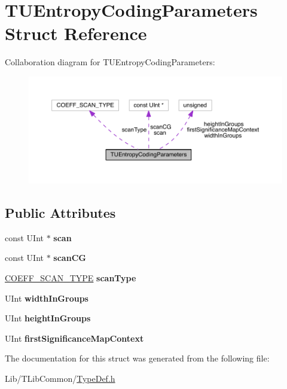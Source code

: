\hypertarget{struct_t_u_entropy_coding_parameters}{}\section{T\+U\+Entropy\+Coding\+Parameters Struct Reference}
\label{struct_t_u_entropy_coding_parameters}


Collaboration diagram for T\+U\+Entropy\+Coding\+Parameters\+:
\nopagebreak
\begin{figure}[H]
\begin{center}
\leavevmode
\includegraphics[width=350pt]{d6/da5/struct_t_u_entropy_coding_parameters__coll__graph}
\end{center}
\end{figure}
\subsection*{Public Attributes}
\begin{DoxyCompactItemize}
\item 
\mbox{\label{struct_t_u_entropy_coding_parameters_a5bad748cbd7600ccf7432b5ea9c61669}} 
const U\+Int $\ast$ {\bfseries scan}
\item 
\mbox{\label{struct_t_u_entropy_coding_parameters_ac28bf9666b747b1cbd0080b193fb5f3a}} 
const U\+Int $\ast$ {\bfseries scan\+CG}
\item 
\mbox{\label{struct_t_u_entropy_coding_parameters_a7c0032d746a077dd462325ded1574e53}} 
\hyperlink{_type_def_8h_a30c02674008b9ee63cee39a5e1261884}{C\+O\+E\+F\+F\+\_\+\+S\+C\+A\+N\+\_\+\+T\+Y\+PE} {\bfseries scan\+Type}
\item 
\mbox{\label{struct_t_u_entropy_coding_parameters_abcb62031ff1232c5ddcc6f91f503d938}} 
U\+Int {\bfseries width\+In\+Groups}
\item 
\mbox{\label{struct_t_u_entropy_coding_parameters_a6ed4823cac43cacc1c34408f9b49bf3a}} 
U\+Int {\bfseries height\+In\+Groups}
\item 
\mbox{\label{struct_t_u_entropy_coding_parameters_a6d5047fc99b481e5db290bf6a33ab0f1}} 
U\+Int {\bfseries first\+Significance\+Map\+Context}
\end{DoxyCompactItemize}


The documentation for this struct was generated from the following file\+:\begin{DoxyCompactItemize}
\item 
Lib/\+T\+Lib\+Common/\hyperlink{_type_def_8h}{Type\+Def.\+h}\end{DoxyCompactItemize}
